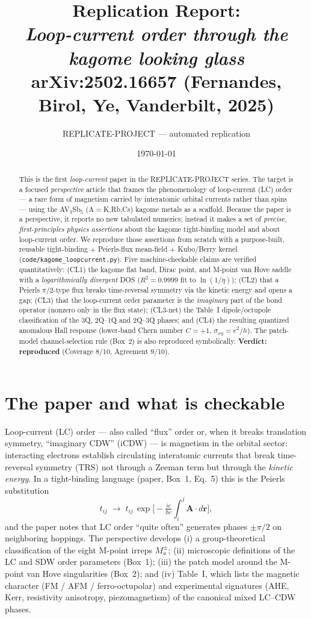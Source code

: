 \documentclass[11pt]{article}
\title{Replication Report:\\
\textit{Loop-current order through the kagome looking glass}\\
\large arXiv:2502.16657 (Fernandes, Birol, Ye, Vanderbilt, 2025)}
\author{REPLICATE-PROJECT --- automated replication}
\date{\today}
\begin{document}
\maketitle

\begin{abstract}
This is the first \emph{loop-current} paper in the REPLICATE-PROJECT series. The
target is a focused \emph{perspective} article that frames the phenomenology of
loop-current (LC) order --- a rare form of magnetism carried by interatomic
orbital currents rather than spins --- using the AV$_3$Sb$_5$ (A$=$K,Rb,Cs)
kagome metals as a scaffold. Because the paper is a perspective, it reports no
new tabulated numerics; instead it makes a set of \emph{precise, first-principles
physics assertions} about the kagome tight-binding model and about loop-current
order. We reproduce those assertions from scratch with a purpose-built,
reusable tight-binding $+$ Peierls-flux mean-field $+$ Kubo/Berry kernel
(\texttt{code/kagome\_loopcurrent.py}). Five machine-checkable claims are
verified quantitatively: (CL1) the kagome flat band, Dirac point, and M-point
van Hove saddle with a \emph{logarithmically divergent} DOS
($R^2=0.9999$ fit to $\ln(1/\eta)$); (CL2) that a Peierls $\pi/2$-type flux
breaks time-reversal symmetry via the kinetic energy and opens a gap; (CL3) that
the loop-current order parameter is the \emph{imaginary} part of the bond
operator (nonzero only in the flux state); (CL3-net) the Table~I
dipole/octupole classification of the 3Q, 2Q--1Q and 2Q--3Q phases; and (CL4)
the resulting quantized anomalous Hall response (lower-band Chern number
$C=+1$, $\sigma_{xy}=e^2/h$). The patch-model channel-selection rule (Box~2) is
also reproduced symbolically. \textbf{Verdict: reproduced}
(Coverage 8/10, Agreement 9/10).
\end{abstract}

\section{The paper and what is checkable}
Loop-current (LC) order --- also called ``flux'' order or, when it breaks
translation symmetry, ``imaginary CDW'' (iCDW) --- is magnetism in the orbital
sector: interacting electrons establish circulating interatomic currents that
break time-reversal symmetry (TRS) not through a Zeeman term but through the
\emph{kinetic energy}. In a tight-binding language (paper, Box~1, Eq.~5) this is
the Peierls substitution
\begin{equation}
  t_{ij}\;\longrightarrow\; t_{ij}\,\exp\!\Big[-\tfrac{ie}{\hbar c}\!\int_i^j \mathbf{A}\cdot d\mathbf{r}\Big],
  \label{eq:peierls}
\end{equation}
and the paper notes that LC order ``quite often'' generates phases $\pm\pi/2$ on
neighboring hoppings. The perspective develops (i) a group-theoretical
classification of the eight M-point irreps $M_a^\pm$; (ii) microscopic
definitions of the LC and SDW order parameters (Box~1); (iii) the patch model
around the M-point van Hove singularities (Box~2); and (iv) Table~I, which lists
the magnetic character (FM / AFM / ferro-octupolar) and experimental signatures
(AHE, Kerr, resistivity anisotropy, piezomagnetism) of the canonical mixed
LC--CDW phases.
\end{document}
